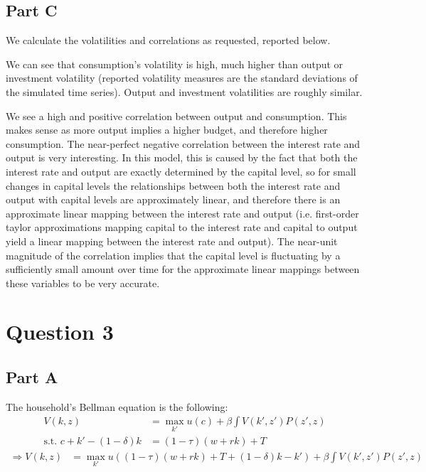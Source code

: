 \documentclass[11pt]{article} %
\begin{document}
\subsection{Part C}
We calculate the volatilities and correlations as requested, reported below.

\begin{center}

\end{center}

We can see that consumption's volatility is high, much higher than output or investment volatility (reported volatility measures are the standard deviations of the simulated time series). Output and investment volatilities are roughly similar.

We see a high and positive correlation between output and consumption. This makes sense as more output implies a higher budget, and therefore higher consumption. The near-perfect negative correlation between the interest rate and output is very interesting. In this model, this is caused by the fact that both the interest rate and output are exactly determined by the capital level, so for small changes in capital levels the relationships between both the interest rate and output with capital levels are approximately linear, and therefore there is an approximate linear mapping between the interest rate and output (i.e. first-order taylor approximations mapping capital to the interest rate and capital to output yield a linear mapping between the interest rate and output). The near-unit magnitude of the correlation implies that the capital level is fluctuating by a sufficiently small amount over time for the approximate linear mappings between these variables to be very accurate.

\section{Question 3}
\subsection{Part A}
The household's Bellman equation is the following:
\begin{align*}
V(k,z) &= \max_{k'} u(c) + \beta \int V(k',z')P(z',z)\\
\text{s.t. } c+k' - (1-\delta)k &= (1-\tau)(w + rk) + T
\end{align*}
\begin{align}
\Rightarrow V(k,z) &= \max_{k'} u((1-\tau)(w + rk) + T + (1-\delta)k - k') + \beta \int V(k',z')P(z',z) \label{eqn:hh}
\end{align}
\end{document}
